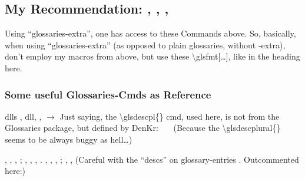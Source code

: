 \subsection{My Recommendation: 
, ,
, 
}

Using \enquote{glossaries-extra}, one has access to these Commands above.\nl
So, basically, when using \enquote{glossaries-extra} (as opposed to plain glossaries, without -extra), don't employ my macros from above, but use these \textbackslash glsfmt[\ldots], like in the heading here.


\subsubsection{Some useful Glossaries-Cmds as Reference}
\glspl{dll}\nl
{}, \glsdesc{dll}, ,\nl
$\rightarrow$ Just saying, the \textbackslash glsdescpl\{\} cmd, used here, is not from the Glossaries package, but defined by DenKr: %
\nl
\ \ \ (Because the \textbackslash glsdescplural\{\} seems to be always buggy as hell\ldots)

\npi
{}, , , ;\nl
{}, , , .\nl
{}, , , ;\nl
{}, , (Careful with the \enquote{descs} on glossary-entries . Outcommented here:)%

